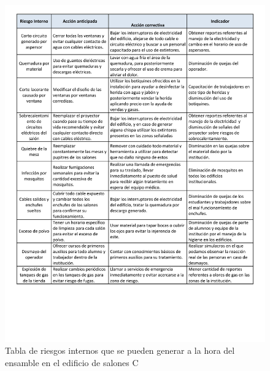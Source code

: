  \begin{figure}[H]
        \centering
        \includegraphics[trim = {1mm 40mm 1mm 1mm},clip,scale=0.35]{19/Img/accionAnti.pdf}
        \caption{Tabla de riesgos internos que se pueden generar a la hora del ensamble en el edificio de salones C}
        \label{fig:accionAnti}
    \end{figure}

